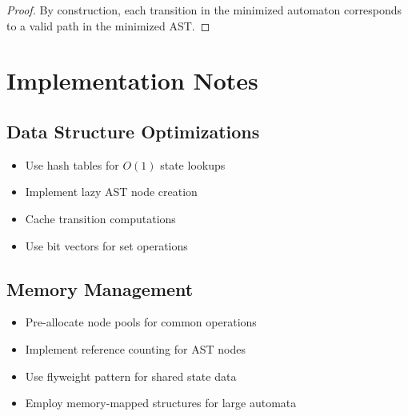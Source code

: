 \documentclass[12pt]{article}
\begin{document}
\begin{proof}
By construction, each transition in the minimized automaton corresponds to a valid path in the minimized AST.
\end{proof}

\section{Implementation Notes}

\subsection{Data Structure Optimizations}
\begin{itemize}
\item Use hash tables for $O(1)$ state lookups
\item Implement lazy AST node creation
\item Cache transition computations
\item Use bit vectors for set operations
\end{itemize}

\subsection{Memory Management}
\begin{itemize}
\item Pre-allocate node pools for common operations
\item Implement reference counting for AST nodes
\item Use flyweight pattern for shared state data
\item Employ memory-mapped structures for large automata
\end{itemize}
\end{document}
